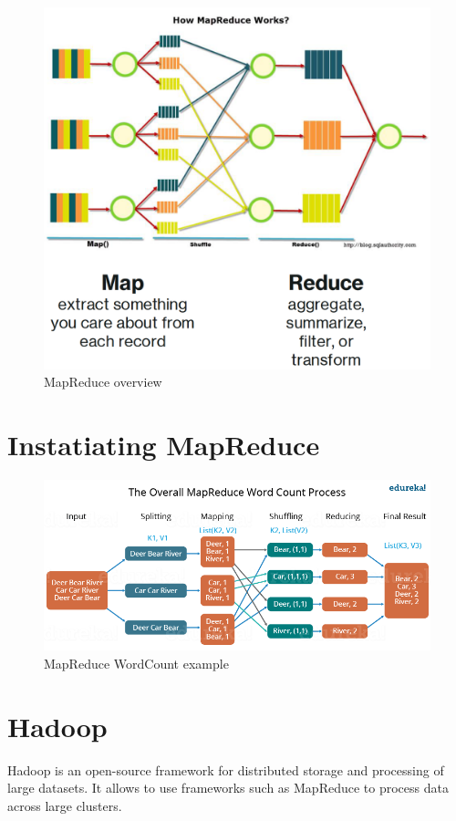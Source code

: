 \begin{figure}[htbp]
   \centering
   \includegraphics{images/14/mapreduce_overview.png}
   \caption{MapReduce overview}
   \label{fig:14/mapreduce_overview}
\end{figure}
\section{Instatiating MapReduce}
\begin{figure}[htbp]
   \centering
   \includegraphics{images/14/mapreduce_wordcount.png}
   \caption{MapReduce WordCount example}
   \label{fig:14/mapreduce_wordcount}
\end{figure}


\section{Hadoop}
Hadoop is an open-source framework for distributed storage and processing of large datasets. It allows to use frameworks such as MapReduce to process data across large clusters.

